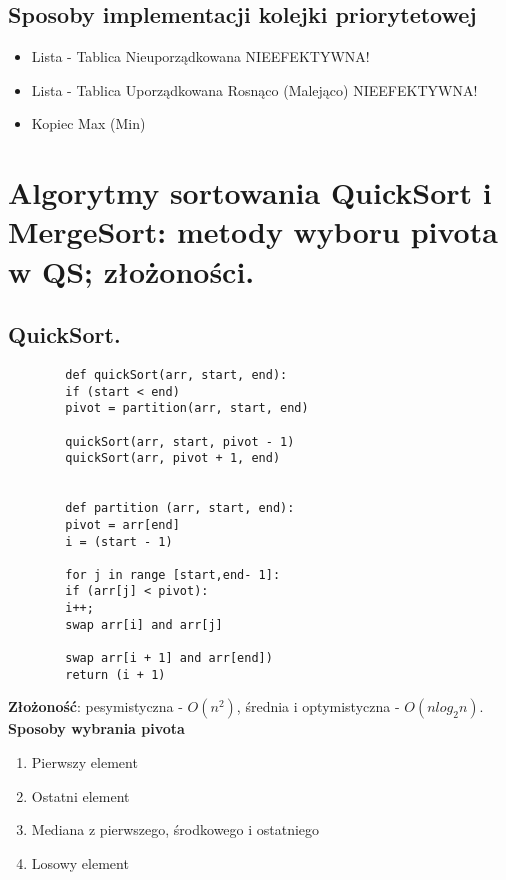 \documentclass[main.tex]{subfiles}
\begin{document}
    \subsection{Sposoby implementacji kolejki priorytetowej}
    \begin{itemize}
        \item Lista - Tablica Nieuporządkowana
        NIEEFEKTYWNA!
        \item Lista - Tablica Uporządkowana Rosnąco (Malejąco)
        NIEEFEKTYWNA!
        \item Kopiec Max (Min)
    \end{itemize}

    \newpage

    \section{Algorytmy sortowania QuickSort i MergeSort: metody wyboru pivota w QS; złożoności.}

    \subsection{QuickSort.}

    \begin{verbatim}
        def quickSort(arr, start, end):
        if (start < end)
        pivot = partition(arr, start, end)

        quickSort(arr, start, pivot - 1)
        quickSort(arr, pivot + 1, end)


        def partition (arr, start, end):
        pivot = arr[end]
        i = (start - 1)

        for j in range [start,end- 1]:
        if (arr[j] < pivot):
        i++;
        swap arr[i] and arr[j]

        swap arr[i + 1] and arr[end])
        return (i + 1)
    \end{verbatim}
    \textbf{Złożoność}: pesymistyczna - $O(n^2)$, średnia i optymistyczna - $O(nlog_2 n)$.\\

    \textbf{Sposoby wybrania pivota}
    \begin{enumerate}
        \item Pierwszy element
        \item Ostatni element
        \item Mediana z pierwszego, środkowego i ostatniego
        \item Losowy element
    \end{enumerate}
    \hfill \\\\
\end{document}
